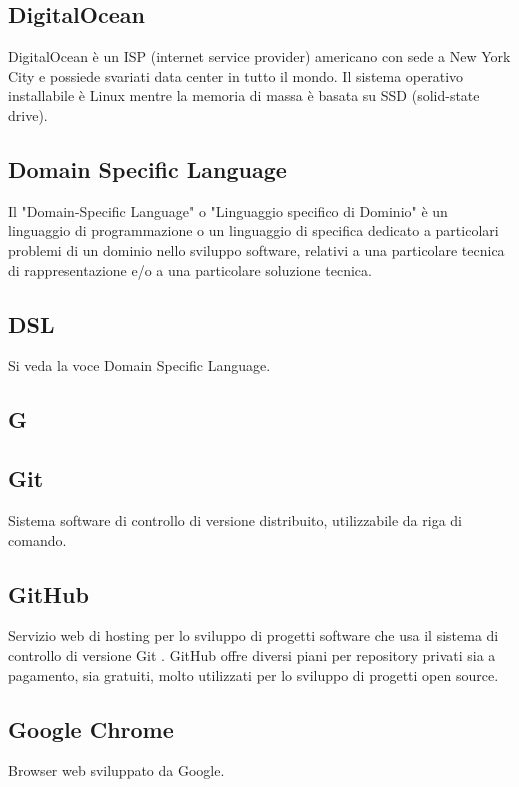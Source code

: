 \subsection*{DigitalOcean}
DigitalOcean è un ISP (internet service provider) americano con sede a New York City e possiede svariati data center in tutto il mondo. Il sistema operativo installabile è Linux mentre la memoria di massa è basata su SSD (solid-state drive).

\subsection*{Domain Specific Language}
Il "Domain-Specific Language" o "Linguaggio specifico di Dominio" è un linguaggio
di programmazione o un linguaggio di specifica dedicato a particolari
problemi di un dominio nello sviluppo software, relativi a una particolare tecnica
di rappresentazione e/o a una particolare soluzione tecnica.

\subsection*{DSL}
Si veda la voce Domain Specific Language.

\newpage

\begin{center}
\Huge\section*{\uppercase{G}}
\end{center}

\subsection*{Git}
Sistema software di controllo di versione distribuito, utilizzabile da riga di comando.

\subsection*{GitHub}
Servizio web di hosting per lo sviluppo di progetti software che usa il sistema di controllo
di versione Git . GitHub offre diversi piani per repository privati sia a pagamento, sia
gratuiti, molto utilizzati per lo sviluppo di progetti open source.

\subsection*{Google Chrome}
Browser web sviluppato da Google.

